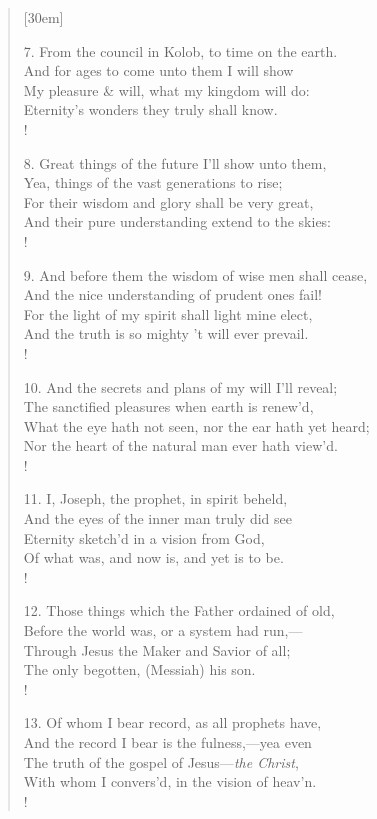 \begin{verse}[30em]
\begin{altverse}
				7. From the council in Kolob, to time on the earth. \\ 
				And for ages to come unto them I will show \\ 
				My pleasure \& will, what my kingdom will do: \\ 
				Eternity's wonders they truly shall know. \\!
				 
				8. Great things of the future I'll show unto them, \\ 
				Yea, things of the vast generations to rise; \\ 
				For their wisdom and glory shall be very great, \\ 
				And their pure understanding extend to the skies: \\!
				 
				9. And before them the wisdom of wise men shall cease, \\ 
				And the nice understanding of prudent ones fail! \\ 
				For the light of my spirit shall light mine elect, \\ 
				And the truth is so mighty 't will ever prevail. \\!
				 
				10. And the secrets and plans of my will I'll reveal; \\ 
				The sanctified pleasures when earth is renew'd, \\ 
				What the eye hath not seen, nor the ear hath yet heard; \\ 
				Nor the heart of the natural man ever hath view'd. \\!
				 
				11. I, Joseph, the prophet, in spirit beheld, \\ 
				And the eyes of the inner man truly did see \\ 
				Eternity sketch'd in a vision from God, \\ 
				Of what was, and now is, and yet is to be. \\!
				 
				12. Those things which the Father ordained of old, \\ 
				Before the world was, or a system had run,--- \\ 
				Through Jesus the Maker and Savior of all; \\ 
				The only begotten, (Messiah) his son. \\!
				 
				13. Of whom I bear record, as all prophets have, \\ 
				And the record I bear is the fulness,---yea even \\ 
				The truth of the gospel of Jesus---\textit{the Christ}, \\ 
				With whom I convers'd, in the vision of heav'n. \\!
				 

\end{altverse}
\end{verse}
